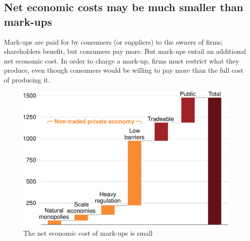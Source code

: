 


\clearpage

\subsection{Net economic costs may be much smaller than mark-ups}

Mark-ups are paid for by consumers (or suppliers) to the owners of firms; shareholders benefit, but consumers pay more.
But mark-ups entail an additional net economic cost. In order to charge a mark-up, firms must restrict what they produce, even though consumers would be willing to pay more than the full cost of producing it.

\begin{figure}
    \caption{The net economic cost of mark-ups is small  \label{fig:SNP-economic-cost}}
    \includegraphics[page=26]{atlas/Charts} 
\end{figure}

